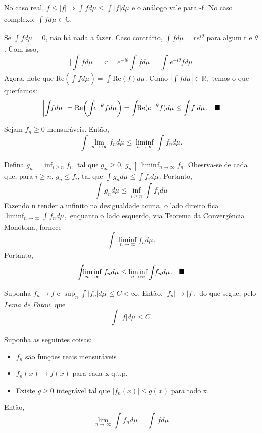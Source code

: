 \documentclass[measure_theory.tex]{subfiles}
\begin{document}
\begin{proof*}
	No caso real, \(f \leq |f| \Rightarrow \int_{}f d\mu_{} \leq \int_{}|f| d\mu_{}\) e o análogo vale para -f. No caso complexo, \(\int_{}f d\mu_{}\in \mathbb{C}.\)

	Se \(\int_{}f d\mu_{} = 0\), não há nada a fazer. Caso contrário, \(\int_{}f d\mu_{} = re^{i\theta }\) para algum r e \(\theta \). Com isso,
	\[
		\biggl\vert \int_{}f d\mu_{} \biggr\vert = r = e^{-i\theta }\int_{}f d\mu_{} = \int_{}e^{-i\theta }f d\mu_{}
	\]
	Agora, note que \(\mathrm{Re}(\int_{}f d\mu_{}) = \int_{}\mathrm{Re}(f) d\mu_{}.\) Como \(|\int_{}f d\mu_{}|\in \mathbb{R},\) temos o que queríamos:
	\[
		\biggl\vert \int_{}f d\mu_{}  \biggr\vert = \mathrm{Re}\biggl(\int_{}e^{-\theta }f d\mu_{}\biggr) = \int_{}\mathrm{Re}(e^{-\theta }f) d\mu_{} \leq \int_{}|f| d\mu_{}.\quad \text{$\blacksquare$}
	\]
\end{proof*}
\hypertarget{fatou}{
	\begin{lemma*}[Fatou]
		Sejam \(f_{n}\geq 0\) mensuráveis. Então,
		\[
			\int_{}\lim_{n\to \infty}f_{n} d\mu_{} \leq \liminf_{n\to \infty}\int_{}f_{n} d\mu_{}.
		\]
	\end{lemma*}}
\begin{proof*}
	Defina \(g_{n} = \inf_{i\geq n}f_{i},\) tal que \(g_{n}\geq 0\),  \(g_{n}\uparrow \liminf_{n\to \infty}f_{n}\). Obesrva-se de cada que, para \(i\geq n\),
	\(g_{n}\leq f_{i}\), tal que \(\int_{}g_{n} d\mu_{} \leq \int_{}f_{i} d\mu_{}.\) Portanto,
	\[
		\int_{}g_{n} d\mu_{} \leq \inf_{i\geq n} \int_{}f_{i} d\mu_{}
	\]
	Fazendo n tender a infinito na desigualdade acima, o lado direito fica \(\liminf_{n\to \infty}\int_{}f_{n} d\mu_{},\) enquanto o lado esquerdo, via Teorema da Convergência Monótona, fornece
	\[
		\int_{}\liminf_{n\to \infty}f_{n} d\mu_{}.
	\]
	Portanto,
	\[
		\int_{}\liminf_{n\to \infty}f_{n} d\mu_{} \leq \liminf_{n\to \infty}\int_{}f_{n} d\mu_{}.\quad \text{$\blacksquare$}
	\]
\end{proof*}
\begin{example}
	Suponha \(f_{n}\longrightarrow f\) e \(\sup_{n}\int_{}|f_{n}| d\mu_{} \leq C < \infty.\) Então, \(|f_{n}|\to |f|,\) do que segue, pelo \hyperlink{fatou}{\textit{Lema de Fatou}}, que
	\[
		\int_{}|f| d\mu_{} \leq C.
	\]
\end{example}
\hypertarget{dominated_convergence}{
	\begin{theorem*}
		Suponha as seguintes coisas:
		\begin{itemize}
			\item \(f_{n}\) são funções reais mensuráveis
			\item \(f_{n}(x)\to f(x)\) para cada x q.t.p.
			\item Existe \(g\geq 0\) integrável tal que \(|f_{n}(x)| \leq g(x)\) para todo x.
		\end{itemize}
		Então,
		\[
			\lim_{n\to \infty}\int_{}f_{n} d\mu_{} = \int_{}f d\mu_{}
		\]
	\end{theorem*}}
\end{document}
